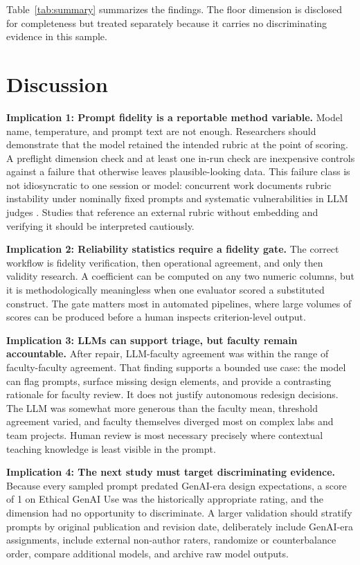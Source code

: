 \documentclass[sigconf]{acmart}
\begin{document}
Table~\ref{tab:summary} summarizes the findings. The floor dimension is disclosed for completeness but treated separately because it carries no discriminating evidence in this sample.

\section{Discussion}
\textbf{Implication 1: Prompt fidelity is a reportable method variable.} Model name, temperature, and prompt text are not enough. Researchers should demonstrate that the model retained the intended rubric at the point of scoring. A preflight dimension check and at least one in-run check are inexpensive controls against a failure that otherwise leaves plausible-looking data. This failure class is not idiosyncratic to one session or model: concurrent work documents rubric instability under nominally fixed prompts and systematic vulnerabilities in LLM judges \cite{hong2026rubrics,thakur2025judging}. Studies that reference an external rubric without embedding and verifying it should be interpreted cautiously.

\textbf{Implication 2: Reliability statistics require a fidelity gate.} The correct workflow is fidelity verification, then operational agreement, and only then validity research. A coefficient can be computed on any two numeric columns, but it is methodologically meaningless when one evaluator scored a substituted construct. The gate matters most in automated pipelines, where large volumes of scores can be produced before a human inspects criterion-level output.

\textbf{Implication 3: LLMs can support triage, but faculty remain accountable.} After repair, LLM-faculty agreement was within the range of faculty-faculty agreement. That finding supports a bounded use case: the model can flag prompts, surface missing design elements, and provide a contrasting rationale for faculty review. It does not justify autonomous redesign decisions. The LLM was somewhat more generous than the faculty mean, threshold agreement varied, and faculty themselves diverged most on complex labs and team projects. Human review is most necessary precisely where contextual teaching knowledge is least visible in the prompt.

\textbf{Implication 4: The next study must target discriminating evidence.} Because every sampled prompt predated GenAI-era design expectations, a score of 1 on Ethical GenAI Use was the historically appropriate rating, and the dimension had no opportunity to discriminate. A larger validation should stratify prompts by original publication and revision date, deliberately include GenAI-era assignments, include external non-author raters, randomize or counterbalance order, compare additional models, and archive raw model outputs.
\end{document}
